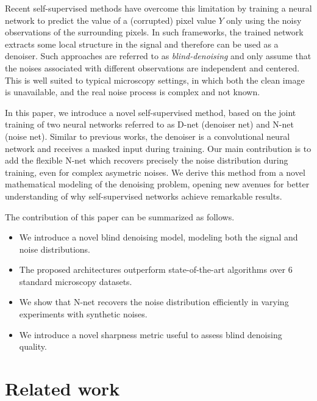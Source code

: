 \documentclass{article}
\begin{document}
Recent self-supervised methods have overcome this limitation \cite{batson2019noise2self,krull2018noise2void} by training a neural network to predict the value of a (corrupted) pixel value $Y$ only using the noisy observations of the surrounding pixels. In such frameworks, the trained network extracts some local structure in the signal and therefore can be used as a denoiser. Such approaches are referred to as \textit{blind-denoising}  and only assume that the noises associated with different observations are independent and centered. This is well suited to typical microscopy settings, in which both the clean image is unavailable, and the real noise process is complex and not known.

In this paper, we introduce a novel self-supervised method, based on the joint training of two neural networks referred to as D-net (denoiser net) and N-net (noise net). Similar to previous works, the denoiser is a convolutional neural network and receives a masked input during training. Our main contribution is to add the flexible N-net
which recovers precisely the noise distribution during training, even for complex asymetric noises. We derive this method from a novel mathematical modeling of the denoising problem, opening new avenues for better understanding of why self-supervised networks achieve remarkable results.

The contribution of this paper can be summarized as follows.
\begin{itemize}
  \item We introduce a novel blind denoising model, modeling both the signal and noise distributions.
  \item The proposed architectures outperform state-of-the-art algorithms  over 6 standard microscopy datasets.
  \item We show that N-net recovers the noise distribution efficiently in varying experiments with synthetic noises.
  \item We introduce a novel sharpness metric useful to assess blind denoising quality.
\end{itemize}

\section{Related work}
\label{sec:related}
\end{document}
